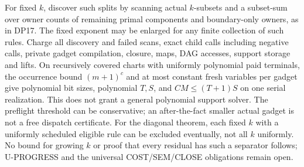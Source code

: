 \documentclass[11pt]{article}
\begin{document}
For fixed $k$, discover such splits by scanning actual $k$-subsets and a subset-sum over owner counts of remaining primal components and boundary-only owners, as in DP17. The fixed exponent may be enlarged for any finite collection of such rules. Charge all discovery and failed scans, exact child calls including negative calls, private gadget compilation, closure, maps, DAG accesses, support storage and lifts. On recursively covered charts with uniformly polynomial paid terminals, the occurrence bound $(m+1)^c$ and at most constant fresh variables per gadget give polynomial bit sizes, polynomial $T,S$, and $CM\le(T+1)S$ on one serial realization. This does not grant a general polynomial support solver. The preflight threshold can be conservative; an after-the-fact smaller actual gadget is not a free dispatch certificate. For the diagonal theorem, each fixed $k$ with a uniformly scheduled eligible rule can be excluded eventually, not all $k$ uniformly. No bound for growing $k$ or proof that every residual has such a separator follows; U-PROGRESS and the universal COST/SEM/CLOSE obligations remain open.
\end{document}

